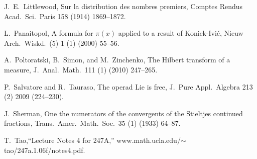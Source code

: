 \documentclass[12pt]{article}
\begin{document}
\begin{thebibliography}{}
 J.\ E.\ Littlewood, Sur la distribution des nombres premiers, Comptes Rendus Acad.\ Sci.\ Paris 158 (1914) 1869--1872.

 L.\ Panaitopol, A formula for $\pi(x)$ applied to a result of Konick-Ivi\'c, Nieuw Arch.\ Wiskd.\ (5) 1 (1) (2000)  55--56.

 A.\ Poltoratski, B.\ Simon, and M.\ Zinchenko, The Hilbert transform of a measure, J.\ Anal.\ Math.\ 111 (1) (2010) 247--265.

  P.\ Salvatore and R.\ Tauraso, The operad Lie is free, J.\ Pure Appl.\ Algebra 213 (2) 2009 (224--230).

 J.\ Sherman, One the numerators of the convergents of the Stieltjes continued fractions,  Trans.\ Amer.\ Math.\ Soc.\ 35 (1) (1933) 64--87.

 T.\ Tao,``Lecture Notes 4 for 247A,'' www.math.ucla.edu/$\scriptstyle \sim$tao/247a.1.06f/notes4.pdf.
 

\end{thebibliography}
\end{document}
